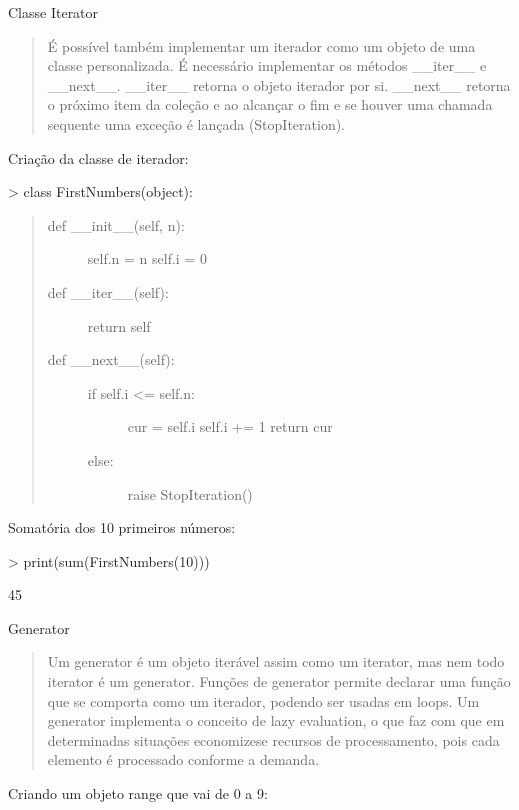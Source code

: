 \documentclass[letterpaper,10pt,brazil]{sphinxmanual}
\begin{document}
Classe Iterator
\begin{quote}

É possível também implementar um iterador como um objeto de uma classe personalizada.
É necessário implementar os métodos \_\_iter\_\_ e \_\_next\_\_.
\_\_iter\_\_ retorna o objeto iterador por si.
\_\_next\_\_ retorna o próximo item da coleção e ao alcançar o fim e se houver uma chamada sequente uma exceção é lançada (StopIteration).
\end{quote}

Criação da classe de iterador:

\textgreater{} class FirstNumbers(object):
\begin{quote}
\begin{description}
\item[{def \_\_init\_\_(self, n):}] \leavevmode
self.n = n
self.i = 0

\item[{def \_\_iter\_\_(self):}] \leavevmode
return self

\item[{def \_\_next\_\_(self):}] \leavevmode\begin{description}
\item[{if self.i \textless{}= self.n:}] \leavevmode
cur = self.i
self.i += 1
return cur

\item[{else:}] \leavevmode
raise StopIteration()

\end{description}

\end{description}
\end{quote}

Somatória dos 10 primeiros números:

\textgreater{} print(sum(FirstNumbers(10)))

45

Generator
\begin{quote}

Um generator é um objeto iterável assim como um iterator, mas nem todo iterator é um generator.
Funções de generator permite declarar uma função que se comporta como um iterador, podendo ser usadas em loops.
Um generator implementa o conceito de lazy evaluation, o que faz com que em determinadas situações economize\sphinxhyphen{}se recursos de processamento, pois cada elemento é processado conforme a demanda.
\end{quote}

Criando um objeto range que vai de 0  a 9:
\end{document}
